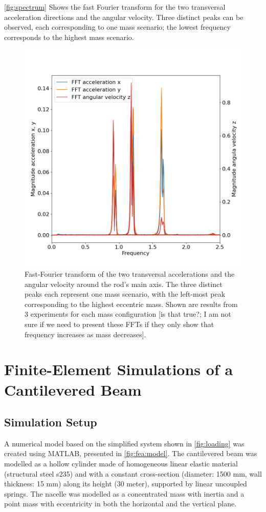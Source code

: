 \documentclass{article}
\begin{document}
\autoref{fig:spectrum} Shows the fast Fourier transform for the two transversal acceleration directions and the angular velocity. Three distinct peaks can be observed, each corresponding to one mass scenario; the lowest frequency corresponds to the highest mass scenario. 

\begin{figure}[ht]
    \centering
    \includegraphics[width=0.5\linewidth]{../results/experiment/spectrum.png}
    \caption{Fast-Fourier transform of the two transversal accelerations and the angular velocity around the rod's main axis. The three distinct peaks each represent one mass scenario, with the left-most peak corresponding to the highest eccentric mass. Shown are results from 3 experiments for each mass configuration [is that true?; I am not sure if we need to present these FFTs if they only show that frequency increases as mass decreases].}
    \label{fig:spectrum}
\end{figure}

\clearpage

\section{Finite-Element Simulations of a Cantilevered Beam}
\label{sec:simulations}

\subsection{Simulation Setup}

A numerical model based on the simplified system shown in \autoref{fig:loading} was created using MATLAB, presented in \autoref{fig:fea:model}. The cantilevered beam was modelled as a hollow cylinder made of  homogeneous linear elastic material (structural steel s235) and with a constant cross-section (diameter: 1500 mm, wall thickness: 15 mm) along its height (30 meter), supported by linear uncoupled springs.  The nacelle was modelled as a concentrated mass with inertia and a point mass with eccentricity in both the horizontal and the vertical plane.
\end{document}
